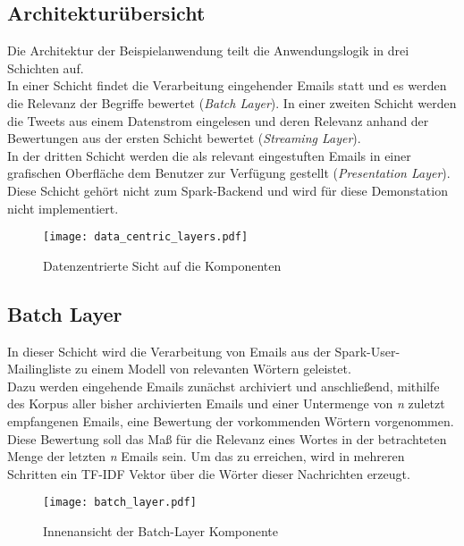 \subsection{Architekturübersicht}

Die Architektur der Beispielanwendung teilt die Anwendungslogik in drei Schichten auf. \\

In einer Schicht findet die Verarbeitung eingehender Emails statt und es werden die Relevanz der Begriffe bewertet (\textit{Batch Layer}).
In einer zweiten Schicht werden die Tweets aus einem Datenstrom eingelesen und deren Relevanz anhand der Bewertungen aus der ersten Schicht bewertet (\textit{Streaming Layer}).\\

In der dritten Schicht werden die als relevant eingestuften Emails in einer grafischen Oberfläche dem Benutzer zur Verfügung gestellt (\textit{Presentation Layer}). Diese Schicht gehört nicht zum Spark-Backend und wird für diese Demonstation nicht implementiert.

\begin{figure}[ht!]
	\centering
  \texttt{[image: data\_centric\_layers.pdf]}
	\caption{Datenzentrierte Sicht auf die Komponenten}
	\label{figure:data_centric_layers}
\end{figure}

\subsection{Batch Layer}

In dieser Schicht wird die Verarbeitung von Emails aus der Spark-User-Mailingliste zu einem Modell von relevanten Wörtern geleistet.\\

Dazu werden eingehende Emails zunächst archiviert und anschließend, mithilfe des Korpus aller bisher archivierten Emails und einer Untermenge von \textit{n} zuletzt empfangenen Emails, eine Bewertung der vorkommenden Wörtern vorgenommen.\\

Diese Bewertung soll das Maß für die Relevanz eines Wortes in der betrachteten Menge der letzten \textit{n} Emails sein. Um das zu erreichen, wird in mehreren Schritten ein TF-IDF Vektor über die Wörter dieser Nachrichten erzeugt.\\

\begin{figure}[ht!]
	\centering
  \texttt{[image: batch\_layer.pdf]}
	\caption{Innenansicht der Batch-Layer Komponente}
	\label{figure:demo_app_batchlayer}
\end{figure}


